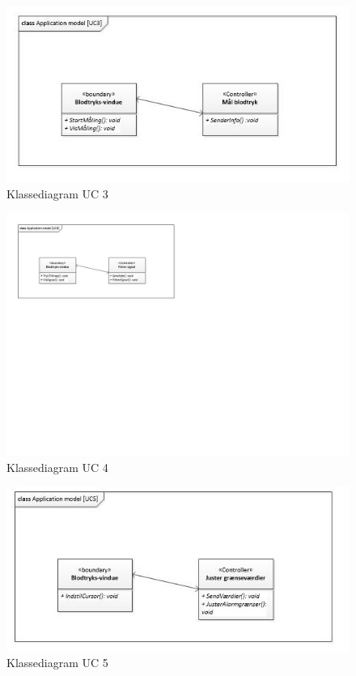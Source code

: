 \begin{figure}[H]
	\centering
	\includegraphics[width=1\textwidth]{Figurer/ISE/classAppModelUC3}
	\caption{Klassediagram UC 3}
	\label{classApp UC3}
\end{figure}

\begin{figure}[H]
	\centering
	\includegraphics[width=1.4\textwidth]{Figurer/ISE/classAppModelUC4}
	\caption{Klassediagram UC 4}
	\label{classApp UC4}
\end{figure}

\begin{figure}[H]
	\centering
	\includegraphics[width=1\textwidth]{Figurer/ISE/classAppModelUC5}
	\caption{Klassediagram UC 5}
	\label{classApp UC5}
\end{figure}

